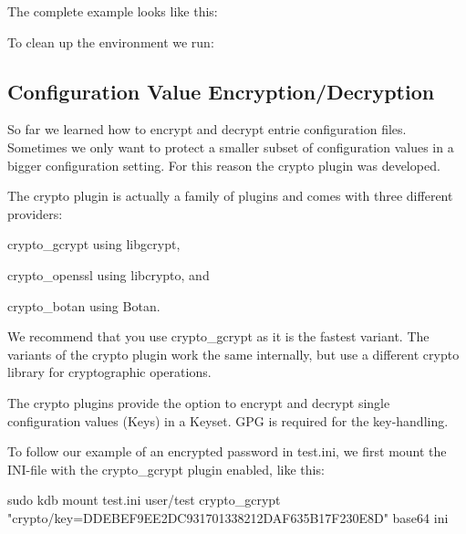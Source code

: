 The complete example looks like this\+:




To clean up the environment we run\+:




\subsection*{Configuration Value Encryption/\+Decryption}

So far we learned how to encrypt and decrypt entrie configuration files. Sometimes we only want to protect a smaller subset of configuration values in a bigger configuration setting. For this reason the {\ttfamily crypto} plugin was developed.

The {\ttfamily crypto} plugin is actually a family of plugins and comes with three different providers\+:


\begin{DoxyEnumerate}
\item {\ttfamily crypto\+\_\+gcrypt} using {\ttfamily libgcrypt},
\item {\ttfamily crypto\+\_\+openssl} using {\ttfamily libcrypto}, and
\item {\ttfamily crypto\+\_\+botan} using {\ttfamily Botan}.
\end{DoxyEnumerate}

We recommend that you use {\ttfamily crypto\+\_\+gcrypt} as it is the fastest variant. The variants of the {\ttfamily crypto} plugin work the same internally, but use a different crypto library for cryptographic operations.

The {\ttfamily crypto} plugins provide the option to encrypt and decrypt single configuration values (Keys) in a Keyset. G\+PG is required for the key-\/handling.

To follow our example of an encrypted password in {\ttfamily test.\+ini}, we first mount the I\+N\+I-\/file with the {\ttfamily crypto\+\_\+gcrypt} plugin enabled, like this\+: \begin{DoxyVerb}sudo kdb mount test.ini user/test crypto_gcrypt "crypto/key=DDEBEF9EE2DC931701338212DAF635B17F230E8D" base64 ini
\end{DoxyVerb}



